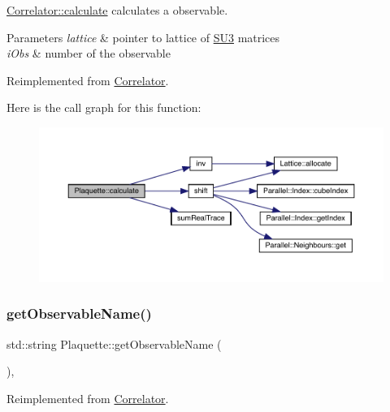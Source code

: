 \mbox{\hyperlink{class_correlator_ab33502ff305f891c5c2e6d66a26a0247}{Correlator\+::calculate}} calculates a observable. 


\begin{DoxyParams}{Parameters}
{\em lattice} & pointer to lattice of \mbox{\hyperlink{class_s_u3}{S\+U3}} matrices \\
\hline
{\em i\+Obs} & number of the observable \\
\hline
\end{DoxyParams}


Reimplemented from \mbox{\hyperlink{class_correlator_ab33502ff305f891c5c2e6d66a26a0247}{Correlator}}.

Here is the call graph for this function\+:
\nopagebreak
\begin{figure}[H]
\begin{center}
\leavevmode
\includegraphics[width=350pt]{class_plaquette_a40cae6fd587c14836bdf61e69c615a00_cgraph}
\end{center}
\end{figure}
\mbox{\label{class_plaquette_a86de9d267ae1bc6a8c6d3335837ea683}} 
\subsubsection{\texorpdfstring{getObservableName()}{getObservableName()}}
{\footnotesize\ttfamily std\+::string Plaquette\+::get\+Observable\+Name (\begin{DoxyParamCaption}{ }\end{DoxyParamCaption})\hspace{0.3cm}{\ttfamily [inline]}, {\ttfamily [virtual]}}



Reimplemented from \mbox{\hyperlink{class_correlator_ad1fa59e864917c3e48da037f90c3488f}{Correlator}}.

